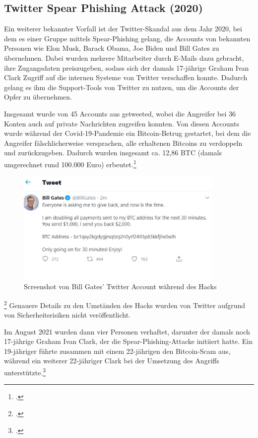 \documentclass[12pt, a4paper, oneside]{scrartcl}
\begin{document}
\subsection{Twitter Spear Phishing Attack (2020)}

Ein weiterer bekannter Vorfall ist der Twitter-Skandal aus dem Jahr 2020, bei dem es einer Gruppe mittels Spear-Phishing gelang,
die Accounts von bekannten Personen wie Elon Musk, Barack Obama, Joe Biden und Bill Gates zu übernehmen.
Dabei wurden mehrere Mitarbeiter durch E-Mails dazu gebracht, ihre Zugangsdaten preiszugeben, sodass sich 
der damals 17-jährige Graham Ivan Clark Zugriff auf die internen Systeme von Twitter verschaffen konnte. Dadurch gelang
es ihm die Support-Tools von Twitter zu nutzen, um die Accounts der Opfer zu übernehmen. 
\par
Insgesamt wurde von 45 Accounts aus getweeted, wobei die Angreifer bei 36 Konten auch auf private Nachrichten zugreifen konnten. 
Von diesen Accounts wurde während der Covid-19-Pandemie ein Bitcoin-Betrug gestartet, bei dem die Angreifer fälschlicherweise versprachen, 
alle erhaltenen Bitcoins zu verdoppeln und zurückzugeben. Dadurch wurden insgesamt ca. 12,86 BTC 
(damals umgerechnet rund 100.000 Euro) erbeutet.\footcite{teampw_TwitterPhishing}

\begin{figure}[h!]
  \centering
  \includegraphics[width=10cm]{bill_hack.png}
  \caption[Screenshot von Bill Gates' Twitter Account während des Hacks]{Screenshot von Bill Gates' Twitter Account während des Hacks\footnotemark}
\end{figure}
\footcitetext{PicTwitterHack}
Genauere Details zu den Umständen des Hacks wurden von Twitter aufgrund von Sicherheitsrisiken nicht veröffentlicht. 
\par
Im August 2021 wurden dann vier Personen verhaftet, darunter der damals noch 17-jährige Graham Ivan Clark, 
der die Spear-Phishing-Attacke initiiert hatte. Ein 19-jähriger führte zusammen mit einem 22-jährigen den 
Bitcoin-Scam aus, während ein weiterer 22-jähriger Clark bei der Umsetzung des Angriffs unterstützte.\footcite{teampw_TwitterPhishing}\\
\end{document}
